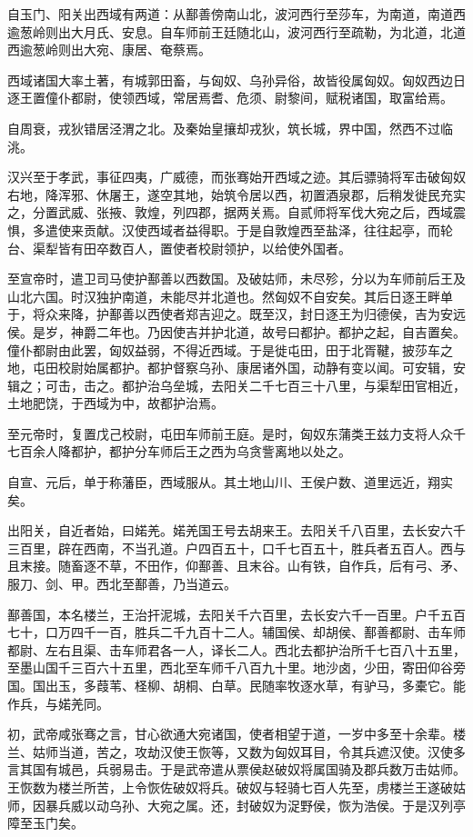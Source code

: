 \documentclass[]{article}
\begin{document}
自玉门、阳关出西域有两道：从鄯善傍南山北，波河西行至莎车，为南道，南道西逾葱岭则出大月氏、安息。自车师前王廷随北山，波河西行至疏勒，为北道，北道西逾葱岭则出大宛、康居、奄蔡焉。

西域诸国大率土著，有城郭田畜，与匈奴、乌孙异俗，故皆役属匈奴。匈奴西边日逐王置僮仆都尉，使领西域，常居焉耆、危须、尉黎间，赋税诸国，取富给焉。

自周衰，戎狄错居泾渭之北。及秦始皇攘却戎狄，筑长城，界中国，然西不过临洮。

汉兴至于孝武，事征四夷，广威德，而张骞始开西域之迹。其后骠骑将军击破匈奴右地，降浑邪、休屠王，遂空其地，始筑令居以西，初置酒泉郡，后稍发徙民充实之，分置武威、张掖、敦煌，列四郡，据两关焉。自贰师将军伐大宛之后，西域震惧，多遣使来贡献。汉使西域者益得职。于是自敦煌西至盐泽，往往起亭，而轮台、渠犁皆有田卒数百人，置使者校尉领护，以给使外国者。

至宣帝时，遣卫司马使护鄯善以西数国。及破姑师，未尽殄，分以为车师前后王及山北六国。时汉独护南道，未能尽并北道也。然匈奴不自安矣。其后日逐王畔单于，将众来降，护鄯善以西使者郑吉迎之。既至汉，封日逐王为归德侯，吉为安远侯。是岁，神爵二年也。乃因使吉并护北道，故号曰都护。都护之起，自吉置矣。僮仆都尉由此罢，匈奴益弱，不得近西域。于是徙屯田，田于北胥鞬，披莎车之地，屯田校尉始属都护。都护督察乌孙、康居诸外国，动静有变以闻。可安辑，安辑之；可击，击之。都护治乌垒城，去阳关二千七百三十八里，与渠犁田官相近，土地肥饶，于西域为中，故都护治焉。

至元帝时，复置戊己校尉，屯田车师前王庭。是时，匈奴东蒲类王兹力支将人众千七百余人降都护，都护分车师后王之西为乌贪訾离地以处之。

自宣、元后，单于称藩臣，西域服从。其土地山川、王侯户数、道里远近，翔实矣。

出阳关，自近者始，曰婼羌。婼羌国王号去胡来王。去阳关千八百里，去长安六千三百里，辟在西南，不当孔道。户四百五十，口千七百五十，胜兵者五百人。西与且末接。随畜逐不草，不田作，仰鄯善、且末谷。山有铁，自作兵，后有弓、矛、服刀、剑、甲。西北至鄯善，乃当道云。

鄯善国，本名楼兰，王治扞泥城，去阳关千六百里，去长安六千一百里。户千五百七十，口万四千一百，胜兵二千九百十二人。辅国侯、却胡侯、鄯善都尉、击车师都尉、左右且渠、击车师君各一人，译长二人。西北去都护治所千七百八十五里，至墨山国千三百六十五里，西北至车师千八百九十里。地沙卤，少田，寄田仰谷旁国。国出玉，多葭苇、柽柳、胡桐、白草。民随率牧逐水草，有驴马，多橐它。能作兵，与婼羌同。

初，武帝咸张骞之言，甘心欲通大宛诸国，使者相望于道，一岁中多至十余辈。楼兰、姑师当道，苦之，攻劫汉使王恢等，又数为匈奴耳目，令其兵遮汉使。汉使多言其国有城邑，兵弱易击。于是武帝遣从票侯赵破奴将属国骑及郡兵数万击姑师。王恢数为楼兰所苦，上令恢佐破奴将兵。破奴与轻骑七百人先至，虏楼兰王遂破姑师，因暴兵威以动乌孙、大宛之属。还，封破奴为浞野侯，恢为浩侯。于是汉列亭障至玉门矣。
\end{document}
